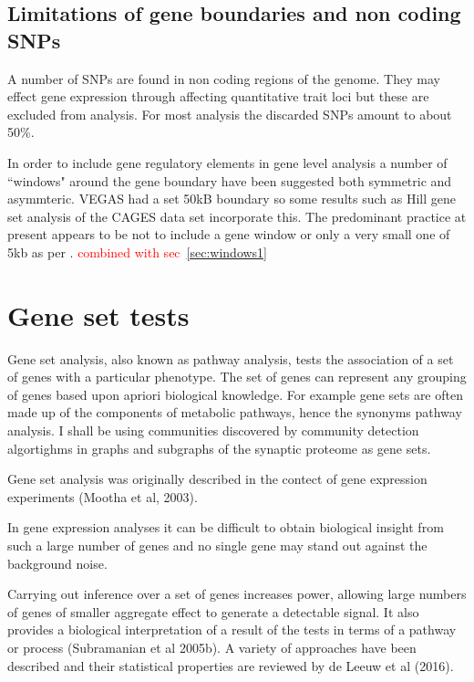 \subsection{Limitations of gene boundaries and non coding SNPs}
A number of SNPs are found in non coding regions of the genome. They may effect gene expression through affecting quantitative trait loci but these are excluded from analysis. For most analysis the discarded SNPs amount to about 50\%.

In order to include gene regulatory elements in gene level analysis a number of ``windows" around the gene boundary have been suggested both symmetric and asymmteric. VEGAS had a set 50kB boundary so some results such as Hill \cite{hill2014human} gene set analysis of the CAGES data set incorporate this. The predominant practice at present appears to be not to include a gene window or only a very small one of 5kb as per \cite{savage2018genome}. \textcolor{red}{combined with sec~\ref{sec:windows1}}


\section{ Gene set tests}
Gene set analysis, also known as pathway analysis, tests the association of a set of genes with a particular phenotype. The set of genes can represent any grouping of genes based upon apriori biological knowledge. For example gene sets are often made up of the components of metabolic pathways, hence the synonyms pathway analysis. I shall be using communities discovered by community detection algortighms in graphs and subgraphs of the synaptic proteome as gene sets.

Gene set analysis was originally described in the contect of gene expression experiments (Mootha et al, 2003).

In gene expression analyses it can be difficult to obtain biological insight from such a large number of genes and no single gene may stand out against the background noise.

Carrying out inference over a set of genes increases power, allowing large numbers of genes of smaller aggregate effect to generate a detectable signal. It also provides a biological interpretation of a result of the tests in terms of a pathway or process (Subramanian et al 2005b). A variety of approaches have been described and their statistical properties are reviewed by de Leeuw et al (2016).


